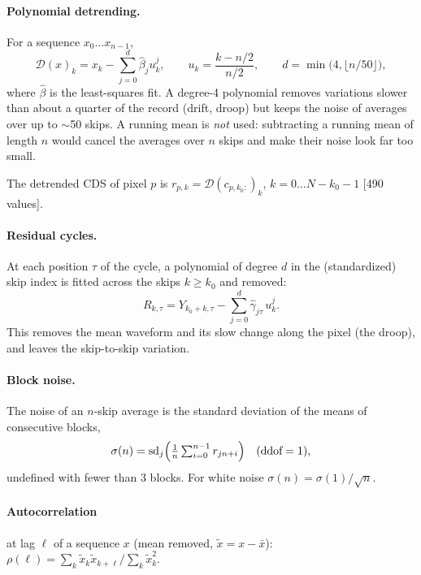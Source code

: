 \documentclass[10pt]{article}
\newcommand{\std}{\operatorname{sd}}
\newcommand{\Dt}{\mathcal D}
\newcommand{\ko}{k_0}
\begin{document}
\paragraph{Polynomial detrending.} For a sequence $x_0 \dots x_{n-1}$,
\begin{equation}
\Dt(x)_k = x_k - \sum_{j=0}^{d} \hat\beta_j u_k^j,\qquad u_k = \frac{k - n/2}{n/2},\qquad d = \min\bigl(4, \lfloor n/50\rfloor\bigr),
\end{equation}
where $\hat\beta$ is the least-squares fit. A degree-4 polynomial removes variations slower than about a quarter of the record (drift,
droop) but keeps the noise of averages over up to $\sim$50 skips. A running mean is \emph{not} used: subtracting a running mean of
length $n$ would cancel the averages over $n$ skips and make their noise look far too small.

The detrended CDS of pixel $p$ is $r_{p,k} = \Dt(c_{p,\ko:})_k$, $k = 0 \dots N - \ko - 1$ [490 values].

\paragraph{Residual cycles.} At each position $\tau$ of the cycle, a polynomial of degree $d$ in the (standardized) skip index is
fitted across the skips $k \ge \ko$ and removed:
\begin{equation}
R_{k,\tau} = Y_{\ko+k,\tau} - \sum_{j=0}^{d} \hat\gamma_{j\tau}\, u_k^j .
\end{equation}
This removes the mean waveform and its slow change along the pixel (the droop), and leaves the skip-to-skip variation.

\paragraph{Block noise.} The noise of an $n$-skip average is the standard deviation of the means of consecutive blocks,
\begin{equation}
\sigma(n) = \std_{j}\Bigl(\tfrac{1}{n}\textstyle\sum_{i=0}^{n-1} r_{jn+i}\Bigr) \quad(\text{ddof} = 1),
\end{equation}
undefined with fewer than 3 blocks. For white noise $\sigma(n) = \sigma(1)/\sqrt n$.

\paragraph{Autocorrelation} at lag $\ell$ of a sequence $x$ (mean removed, $\tilde x = x - \bar x$):
$\rho(\ell) = \sum_{k} \tilde x_k \tilde x_{k+\ell} \big/ \sum_k \tilde x_k^2$.
\end{document}
